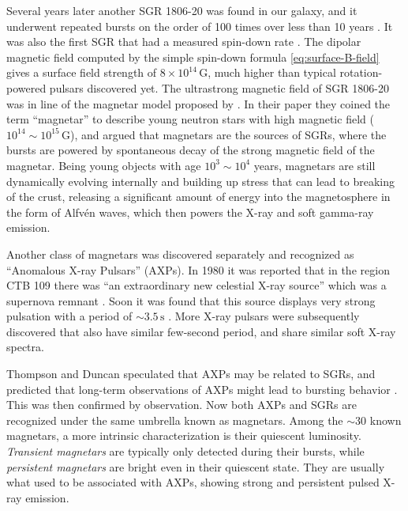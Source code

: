 Several years later another SGR 1806-20 was found in our galaxy, and it
underwent repeated bursts on the order of 100 times over less than 10 years
\citep{kouveliotou_smm_1987,laros_new_1987}. It was also the first SGR that had
a measured spin-down rate \citep{kouveliotou_x-ray_1998}. The dipolar magnetic
field computed by the simple spin-down formula \eqref{eq:surface-B-field} gives
a surface field strength of $8\times 10^{14}\,\mathrm{G}$, much higher than
typical rotation-powered pulsars discovered yet. The ultrastrong magnetic field
of SGR 1806-20 was in line of the magnetar model proposed by
\citet{duncan_formation_1992}. In their paper they coined the term ``magnetar''
to describe young neutron stars with high magnetic field ($10^{14}\sim
10^{15}\,\mathrm{G}$), and argued that magnetars are the sources of SGRs, where
the bursts are powered by spontaneous decay of the strong magnetic field of the
magnetar. Being young objects with age $10^{3}\sim 10^{4}$ years, magnetars are
still dynamically evolving internally and building up stress that can lead to
breaking of the crust, releasing a significant amount of energy into the
magnetosphere in the form of Alfvén waves, which then powers the X-ray and soft
gamma-ray emission.

Another class of magnetars was discovered separately and recognized as
``Anomalous X-ray Pulsars'' (AXPs). In 1980 it was reported that in the
region CTB 109 there was ``an extraordinary new celestial X-ray
source'' which was a supernova remnant \citep{gregory_extraordinary_1980}. Soon
it was found that this source displays very strong pulsation with a period of
$\sim 3.5\,\mathrm{s}$ \citep{fahlman_x-ray_1981}. More X-ray pulsars were
subsequently discovered that also have similar few-second period, and share
similar soft X-ray spectra.

Thompson and Duncan speculated that AXPs may be related to SGRs, and predicted
that long-term observations of AXPs might lead to bursting behavior
\citet{thompson_soft_1996}. This was then confirmed by
observation. %
Now both AXPs and SGRs are recognized under the same umbrella known as
magnetars. Among the $\sim 30$ known magnetars, a more intrinsic
characterization is their quiescent luminosity. {\it Transient magnetars} are
typically only detected during their bursts, while {\it persistent magnetars}
are bright even in their quiescent state. They are usually what used to be
associated with AXPs, showing strong and persistent pulsed X-ray emission.

